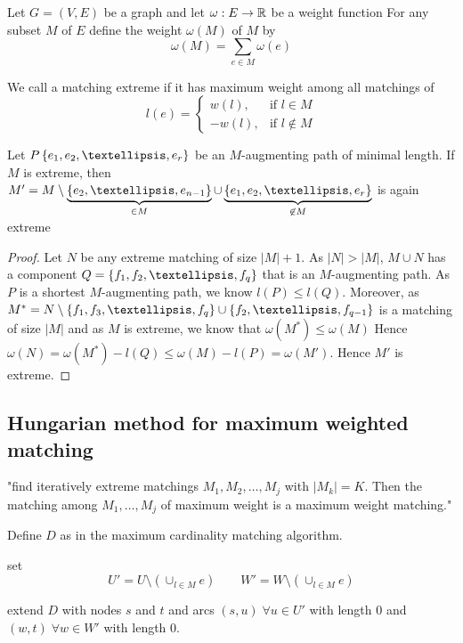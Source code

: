 Let $G=(V,E)$ be a graph and let $\omega: E \rightarrow \mathbb{R}$ be a weight function
For any subset $M$ of $E$ define the weight $\omega(M)$ of $M$ by \[
	\omega(M) = \sum\limits_{e \in M}\omega(e)
\]

\begin{defn+}
	We call a matching extreme if it has maximum weight among all matchings of 
	\[
		l(e) =
		\begin{cases}
			w(l), & \text{if } l\in M \\
			-w(l), & \text{if } l \not \in M
		\end{cases}
	\]	
\end{defn+}

\begin{lem}
	Let $P \plainset{e_1, e_2, …, e_r}$ be an $M$-augmenting path of minimal length.
	If $M$ is extreme, then $M' = M \setminus \underbrace{\plainset{e_2, …, e_{n-1}}}_{\in M} \cup \underbrace{\plainset{e_1, e_2, …, e_r}}_{\not \in M}$ is again extreme
\end{lem}

\begin{proof}
	Let $N$ be any extreme matching of size $|M| + 1$. As $|N| > |M|$, $M \cup N$
	has a component $Q = \plainset{f_1, f_2, …, f_q}$ that is an $M$-augmenting path.
	As $P$ is a shortest $M$-augmenting path, we know $l(P) \leq l(Q)$. Moreover,
	as $M^*=N\setminus \plainset{f_1, f_3, …, f_q} \cup \plainset{f_2, …, f_{q-1}}$ 
	is a matching of size $|M|$ and as $M$ is extreme, we know that $\omega(M^*) \leq \omega(M)$
	Hence $\omega(N) = \omega(M^*) - l(Q) \leq \omega (M) - l(P) = \omega(M')$.
	Hence $M'$ is extreme.
\end{proof}

\subsection*{Hungarian method for maximum weighted matching}
"find iteratively extreme matchings $M_1, M_2, …, M_j$ with $|M_k|=K$. Then the
matching among $M_1, …, M_j$ of maximum weight is a maximum weight matching."

Define  $D$ as in the maximum cardinality matching algorithm.

set \[U'=U\setminus (\cup_{l\in M}e) \qquad W'=W\setminus ( \cup_{l \in M}e) \]

extend $D$ with nodes $s$ and $t$ and arcs $(s,u) \; \forall u \in U'$ with 
length $0$ and $(w,t) \; \forall w \in W'$ with length $0$.

